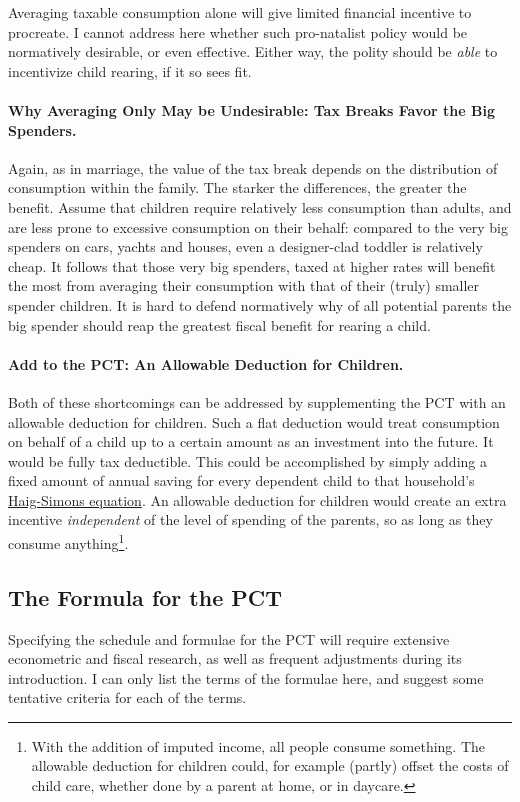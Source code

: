 Averaging taxable consumption alone will give limited financial incentive to procreate. I cannot address here whether such pro-natalist policy would be normatively desirable, or even effective. Either way, the polity should be \emph{able} to incentivize child rearing, if it so sees fit.

\paragraph{Why Averaging Only May be Undesirable: Tax Breaks Favor the Big Spenders.} Again, as in marriage, the value of the tax break depends on the distribution of consumption within the family. The starker the differences, the greater the benefit. Assume that children require relatively less consumption than adults, and are less prone to excessive consumption on their behalf: compared to the very big spenders on cars, yachts and houses, even a designer-clad toddler is relatively cheap. It follows that those very big spenders, taxed at higher rates will benefit the most from averaging their consumption with that of their (truly) smaller spender children. It is hard to defend normatively why of all potential parents the big spender should reap the greatest fiscal benefit for rearing a child.

\paragraph{Add to the PCT: An Allowable Deduction for Children.} Both of these shortcomings can be addressed by supplementing the PCT with an allowable deduction for children. 
Such a flat deduction would treat consumption on behalf of a child up to a certain amount as an investment into the future. It would be fully tax deductible. This could be accomplished by simply adding a fixed amount of annual saving for every dependent child to that household's \hyperref[eq:Haig-Simons]{Haig-Simons equation}. An allowable deduction for children would create an extra incentive \emph{independent} of the level of spending of the parents, so as long as they consume anything\footnote{
	With the addition of imputed income, all people consume something. The allowable deduction for children could, for example (partly) offset the costs of child care, whether done by a parent at home, or in daycare.}.

\subsection{The Formula for the PCT} Specifying the schedule and formulae for the PCT will require extensive econometric and fiscal research, as well as frequent adjustments during its introduction. I can only list the terms of the formulae here, and suggest some tentative criteria for each of the terms.	


